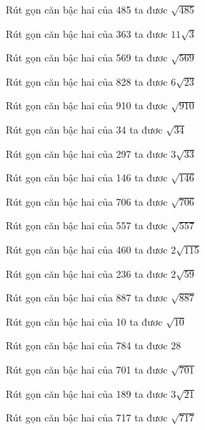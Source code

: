 \documentclass[12pt,a4paper]{article}
\begin{document}
\begin{ex}
Rút gọn căn bậc hai của 485 ta đươc $\sqrt{485}$
\end{ex}
\begin{ex}
Rút gọn căn bậc hai của 363 ta đươc $11\sqrt{3}$
\end{ex}
\begin{ex}
Rút gọn căn bậc hai của 569 ta đươc $\sqrt{569}$
\end{ex}
\begin{ex}
Rút gọn căn bậc hai của 828 ta đươc $6\sqrt{23}$
\end{ex}
\begin{ex}
Rút gọn căn bậc hai của 910 ta đươc $\sqrt{910}$
\end{ex}
\begin{ex}
Rút gọn căn bậc hai của 34 ta đươc $\sqrt{34}$
\end{ex}
\begin{ex}
Rút gọn căn bậc hai của 297 ta đươc $3\sqrt{33}$
\end{ex}
\begin{ex}
Rút gọn căn bậc hai của 146 ta đươc $\sqrt{146}$
\end{ex}
\begin{ex}
Rút gọn căn bậc hai của 706 ta đươc $\sqrt{706}$
\end{ex}
\begin{ex}
Rút gọn căn bậc hai của 557 ta đươc $\sqrt{557}$
\end{ex}
\begin{ex}
Rút gọn căn bậc hai của 460 ta đươc $2\sqrt{115}$
\end{ex}
\begin{ex}
Rút gọn căn bậc hai của 236 ta đươc $2\sqrt{59}$
\end{ex}
\begin{ex}
Rút gọn căn bậc hai của 887 ta đươc $\sqrt{887}$
\end{ex}
\begin{ex}
Rút gọn căn bậc hai của 10 ta đươc $\sqrt{10}$
\end{ex}
\begin{ex}
Rút gọn căn bậc hai của 784 ta đươc $28$
\end{ex}
\begin{ex}
Rút gọn căn bậc hai của 701 ta đươc $\sqrt{701}$
\end{ex}
\begin{ex}
Rút gọn căn bậc hai của 189 ta đươc $3\sqrt{21}$
\end{ex}
\begin{ex}
Rút gọn căn bậc hai của 717 ta đươc $\sqrt{717}$
\end{ex}
\end{document}
